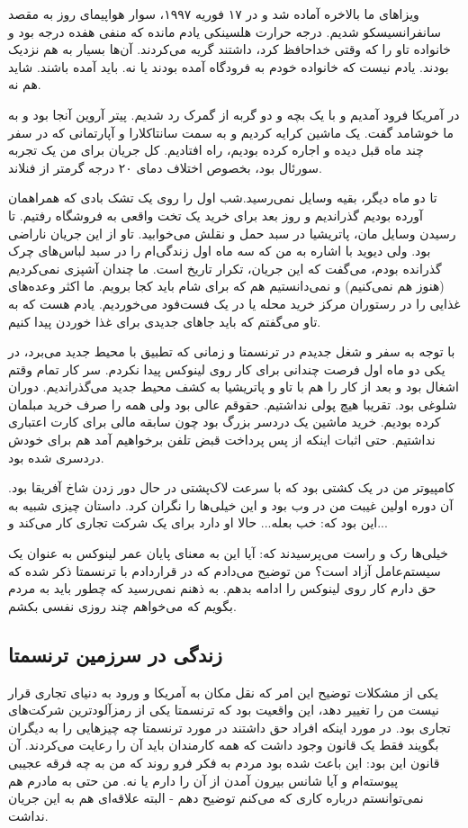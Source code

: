 ویزاهای ما بالاخره آماده شد و در ۱۷ فوریه ۱۹۹۷، سوار هواپیمای روز به
مقصد سانفرانسیسکو شدیم. درجه حرارت هلسینکی یادم مانده که منفی هفده
درجه بود و خانواده تاو را که وقتی خداحافظ کرد، داشتند گریه
می‌کردند. آن‌ها بسیار به هم نزدیک بودند. یادم نیست که خانواده خودم به
فرودگاه آمده بودند یا نه. باید آمده باشند. شاید هم نه.

در آمریکا فرود آمدیم و با یک بچه و دو گربه از گمرک رد شدیم. پیتر آروین
آنجا بود و به ما خوشامد گفت. یک ماشین کرایه کردیم و به سمت سانتاکلارا
و آپارتمانی که در سفر چند ماه قبل دیده و اجاره کرده بودیم، راه
افتادیم. کل جریان برای من یک تجربه سورئال بود، بخصوص اختلاف دمای ۲۰
درجه‌ گرمتر از فنلاند.

تا دو ماه دیگر، بقیه وسایل نمی‌رسید.شب اول را روی یک تشک بادی که
همراهمان آورده بودیم گذراندیم و روز بعد برای خرید یک تخت واقعی به
فروشگاه رفتیم. تا رسیدن وسایل مان، پاتریشیا در سبد حمل و نقلش
می‌خوابید. تاو از این جریان ناراضی بود. ولی دیوید با اشاره به من که سه
ماه اول زندگی‌ام را در سبد لباس‌های چرک گذرانده بودم، می‌گفت که این
جریان، تکرار تاریخ است. ما چندان آشپزی نمی‌کردیم (هنوز هم نمی‌کنیم) و
نمی‌دانستیم هم که برای شام باید کجا برویم. ما اکثر وعده‌های غذایی را در
رستوران مرکز خرید محله یا در یک فست‌فود می‌خوردیم. یادم هست که به تاو
می‌گفتم که باید جاهای جدیدی برای غذا خوردن پیدا کنیم.

با توجه به سفر و شغل جدیدم در ترنسمتا و زمانی که تطبیق با محیط جدید
می‌برد، در یکی دو ماه اول فرصت چندانی برای کار روی لینوکس پیدا
نکردم. سر کار تمام وقتم اشغال بود و بعد از کار را هم با تاو و پاتریشیا
به کشف محیط جدید می‌گذراندیم. دوران شلوغی بود. تقریبا هیچ پولی
نداشتیم. حقوقم عالی بود ولی همه را صرف خرید مبلمان کرده بودیم. خرید
ماشین یک دردسر بزرگ بود چون سابقه مالی برای کارت اعتباری نداشتیم. حتی
اثبات اینکه از پس پرداخت قبض تلفن برخواهیم آمد هم برای خودش دردسری شده
بود.

کامپیوتر من در یک کشتی بود که با سرعت لاک‌پشتی در حال دور زدن شاخ
آفریقا بود. آن دوره اولین غیبت من در وب بود و این خیلی‌ها را نگران
کرد. داستان چیزی شبیه به این بود که: خب بعله... حالا او دارد برای یک
شرکت تجاری کار می‌کند و...

خیلی‌ها رک و راست می‌پرسیدند که: آیا این به معنای پایان عمر لینوکس به
عنوان یک سیستم‌عامل آزاد است؟ من توضیح می‌دادم که در قراردادم با ترنسمتا
ذکر شده که حق دارم کار روی لینوکس را ادامه بدهم. به ذهنم نمی‌رسید که
چطور باید به مردم بگویم که می‌خواهم چند روزی نفسی بکشم.



\subsection*{زندگی در سرزمین ترنسمتا}
یکی از مشکلات توضیح این امر که نقل مکان به آمریکا و ورود به دنیای
تجاری قرار نیست من را تغییر دهد، این واقعیت بود که ترنسمتا یکی از
رمزآلودترین شرکت‌های تجاری بود. در مورد اینکه افراد حق داشتند در مورد
ترنسمتا چه چیزهایی را به دیگران بگویند فقط یک قانون وجود داشت که همه
کارمندان باید آن را رعایت می‌کردند. آن قانون این بود:  این باعث شده بود مردم به فکر فرو روند که من
به چه فرقه عجیبی پیوسته‌ام و آیا شانس بیرون آمدن از آن را دارم یا
نه. من حتی به مادرم هم نمی‌توانستم درباره کاری که می‌کنم توضیح دهم -
البته علاقه‌ای هم به این جریان نداشت.

